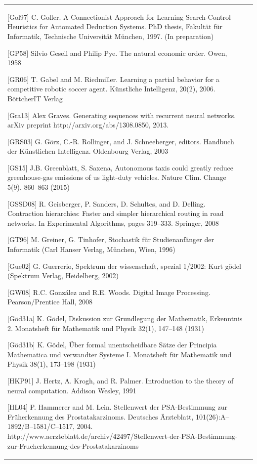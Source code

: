 \documentclass[10pt]{book}
\begin{document}
\begin{tabular}{|l|l|}
[Gol97] C. Goller. A Connectionist Approach for Learning Search-Control Heuristics for Automated Deduction Systems. PhD thesis, Fakultät für Informatik, Technische Universität München, 1997. (In preparation)

[GP58] Silvio Gesell and Philip Pye. The natural economic order. Owen, 1958

[GR06] T. Gabel and M. Riedmiller. Learning a partial behavior for a competitive robotic soccer agent. Künstliche Intelligenz, 20(2), 2006. BöttcherIT Verlag

[Gra13] Alex Graves. Generating sequences with recurrent neural networks. arXiv preprint http://arxiv.org/abs/1308.0850, 2013.

[GRS03] G. Görz, C.-R. Rollinger, and J. Schneeberger, editors. Handbuch der Künstlichen Intelligenz. Oldenbourg Verlag, 2003

[GS15] J.B. Greenblatt, S. Saxena, Autonomous taxis could greatly reduce greenhouse-gas emissions of us light-duty vehicles. Nature Clim. Change 5(9), 860–863 (2015)

[GSSD08] R. Geisberger, P. Sanders, D. Schultes, and D. Delling. Contraction hierarchies: Faster and simpler hierarchical routing in road networks. In Experimental Algorithms, pages 319–333. Springer, 2008

[GT96] M. Greiner, G. Tinhofer, Stochastik für Studienanfänger der Informatik (Carl Hanser Verlag, München, Wien, 1996)

[Gue02] G. Guerrerio, Spektrum der wissenschaft, spezial 1/2002: Kurt gödel (Spektrum Verlag, Heidelberg, 2002)

[GW08] R.C. González and R.E. Woods. Digital Image Processing. Pearson/Prentice Hall, 2008

[Göd31a] K. Gödel, Diskussion zur Grundlegung der Mathematik, Erkenntnis 2. Monatsheft für Mathematik und Physik 32(1), 147–148 (1931)

[Göd31b] K. Gödel, Über formal unentscheidbare Sätze der Principia Mathematica und verwandter Systeme I. Monatsheft für Mathematik und Physik 38(1), 173–198 (1931)

[HKP91] J. Hertz, A. Krogh, and R. Palmer. Introduction to the theory of neural computation. Addison Wesley, 1991

[HL04] P. Hammerer and M. Lein. Stellenwert der PSA-Bestimmung zur Früherkennung des Prostatakarzinoms. Deutsches Ärzteblatt, 101(26):A–1892/B–1581/C–1517, 2004. http://www.aerzteblatt.de/archiv/42497/Stellenwert-der-PSA-Bestimmung-zur-Frueherkennung-des-Prostatakarzinoms


\end{tabular}
\end{document}
